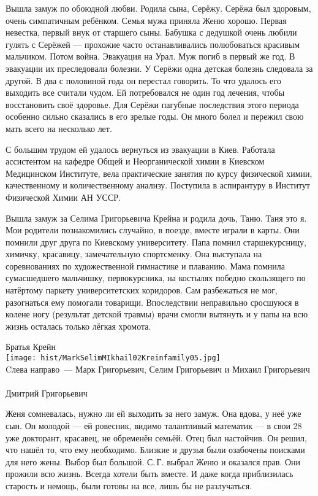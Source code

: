 Вышла замуж по обоюдной любви. Родила сына, Серёжу. Серёжа был здоровым, очень симпатичным ребёнком. Семья мужа приняла Женю хорошо. Первая невестка, первый внук от старшего сыны. Бабушка с дедушкой очень любили гулять с Серёжей --- прохожие часто останавливались полюбоваться красивым мальчиком. Потом война. Эвакуация на Урал. Муж погиб в первый же год. В эвакуации их преследовали болезни. У Серёжи одна детская болезнь следовала за другой. В два с половиной года он перестал говорить. То что удалось его выходить все считали чудом. Ей потребовался не один год лечения, чтобы восстановить своё здоровье. Для Серёжи пагубные последствия этого периода особенно сильно сказались в его зрелые годы. Он много болел и пережил свою мать всего на несколько лет.

С большим трудом ей удалось вернуться из эвакуации в Киев. Работала ассистентом на кафедре Общей и Неорганической химии в Киевском Медицинском Институте, вела практические занятия по курсу физической химии, качественному и количественному анализу. Поступила в аспирантуру в Институт Физической Химии АН УССР.

Вышла замуж за Селима Григорьевича Крейна и родила дочь, Таню. Таня это я. Мои родители познакомились случайно, в поезде, вместе играли в карты. Они помнили друг друга по Киевскому университету. Папа помнил старшекурсницу, химичку, красавицу, замечательную спортсменку. Она выступала на соревнованиях по художественной гимнастике и плаванию. Мама помнила сумасшедшего мальчишку, первокурсника, на костылях победно скользящего по натёртому паркету университетских коридоров. Сам разбежаться не мог, разогнаться ему помогали товарищи. Впоследствии неправильно сросшуюся в колене ногу (результат детской травмы) врачи смогли вытянуть и у папы на всю жизнь осталась только лёгкая хромота.

\begin{center}
{\centering
Братья Крейн
\\
{\texttt{[image: hist/MarkSelimMIkhail02Kreinfamily05.jpg]}}
\\
Cлева направо~--- Марк Григорьевич, Селим Григорьевич и Михаил Григорьевич
\\
{}
\\
Дмитрий Григорьевич
}
\end{center}



Женя сомневалась, нужно ли ей выходить за него замуж. Она вдова, у неё уже сын. Он молодой --- ей ровесник, видимо талантливый математик --- в свои 28 уже докторант, красавец, не обременён семьёй. Отец был настойчив. Он решил, что нашёл то, что ему необходимо. Близкие и друзья были озабочены поисками для него жены. Выбор был большой. С.\,Г. выбрал Женю и оказался прав. Они прожили всю жизнь. Всегда хотели быть вместе. И даже когда приблизилась старость и немощь, были готовы на все, лишь бы не разлучаться.

